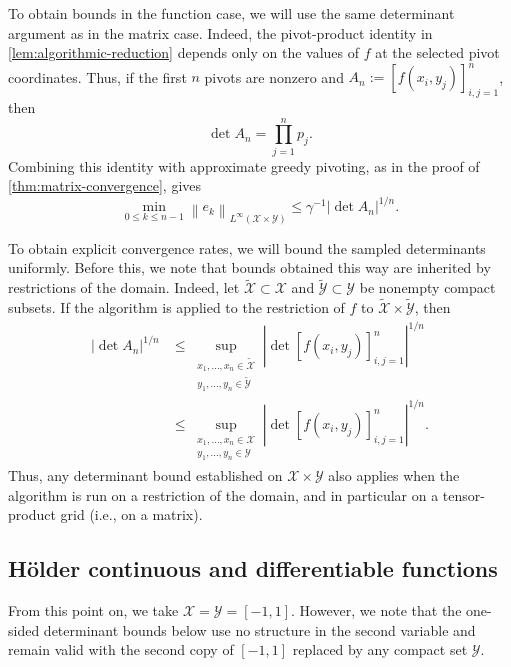 \documentclass[11pt]{article}
\theoremstyle{definition}
\theoremstyle{remark}
\newcommand{\norm}[1]{\left\lVert #1\right\rVert}
\newcommand{\abs}[1]{\left\lvert #1\right\rvert}
\begin{document}
To obtain bounds in the function case, we will use the same determinant argument as in the matrix case. Indeed, the
pivot-product identity in \cref{lem:algorithmic-reduction} depends only on
the values of $f$ at the selected pivot coordinates. Thus, if the first
$n$ pivots are nonzero and
$A_n:=[f(x_i,y_j)]_{i,j=1}^n$, then
\[
    \det A_n=\prod_{j=1}^n p_j.
\]
Combining this identity with approximate greedy pivoting, as in the proof
of \cref{thm:matrix-convergence}, gives
\begin{equation}
    \min_{0\le k\le n-1}
    \norm{e_k}_{L^\infty(\mathcal X\times\mathcal Y)}
    \le
    \gamma^{-1}\abs{\det A_n}^{1/n}.
    \label{eq:best-residual-from-determinant}
\end{equation}

To obtain explicit convergence rates, we will bound the sampled
determinants uniformly. Before this, we note that bounds obtained this way are inherited by restrictions of the
domain. Indeed, let
$\widetilde{\mathcal X}\subset\mathcal X$ and
$\widetilde{\mathcal Y}\subset\mathcal Y$ be nonempty compact subsets.
If the algorithm is applied to the restriction of $f$ to
$\widetilde{\mathcal X}\times\widetilde{\mathcal Y}$, then
\[
\begin{aligned}
    \abs{\det A_n}^{1/n}
    &\le
    \sup_{\substack{
      x_1,\ldots,x_n\in\widetilde{\mathcal X}\\
      y_1,\ldots,y_n\in\widetilde{\mathcal Y}
    }}
    \abs{\det[f(x_i,y_j)]_{i,j=1}^n}^{1/n}\\
    &\le
    \sup_{\substack{
      x_1,\ldots,x_n\in\mathcal X\\
      y_1,\ldots,y_n\in\mathcal Y
    }}
    \abs{\det[f(x_i,y_j)]_{i,j=1}^n}^{1/n}.
\end{aligned}
\]
Thus, any determinant bound established on
$\mathcal X\times\mathcal Y$ also applies when the algorithm is run on a
restriction of the domain, and in particular on a tensor-product grid
(i.e., on a matrix).

\subsection{H\"older continuous and differentiable functions}
\label{subsec:one-dimensional-holder}

From this point on, we take
$\mathcal X=\mathcal Y=[-1,1]$. However, we note that the one-sided determinant bounds below
use no structure in the second variable and remain valid with the second
copy of $[-1,1]$ replaced by any compact set $\mathcal Y$.
\end{document}
